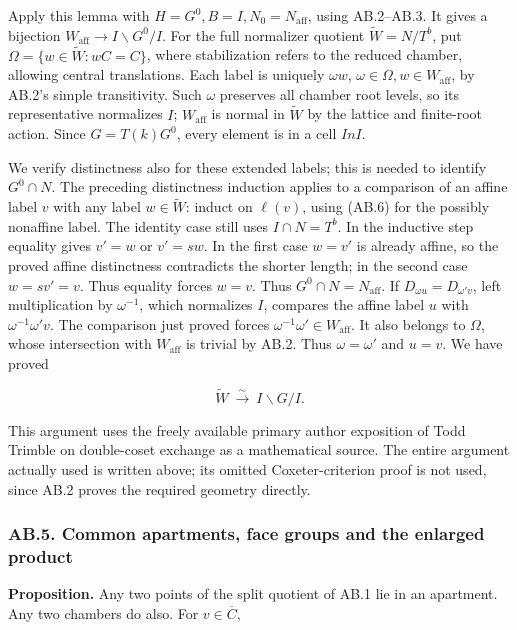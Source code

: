 \documentclass[
  11pt,
]{article}
\begin{document}
Apply this lemma with \(H=G^0,B=I,N_0=N_{\mathrm{aff}}\), using
AB.2--AB.3. It gives a bijection
\(W_{\mathrm{aff}}\to I\backslash G^0/I\). For the full normalizer
quotient \(\widetilde W=N/T^b\), put
\(\Omega=\{w\in\widetilde W:wC=C\}\), where stabilization refers to the
reduced chamber, allowing central translations. Each label is uniquely
\(\omega w\), \(\omega\in\Omega,w\in W_{\mathrm{aff}}\), by AB.2's
simple transitivity. Such \(\omega\) preserves all chamber root levels,
so its representative normalizes \(I\); \(W_{\mathrm{aff}}\) is normal
in \(\widetilde W\) by the lattice and finite-root action. Since
\(G=T(k)G^0\), every element is in a cell \(InI\).

We verify distinctness also for these extended labels; this is needed to
identify \(G^0\cap N\). The preceding distinctness induction applies to
a comparison of an affine label \(v\) with any label
\(w\in\widetilde W\): induct on \(\ell(v)\), using (AB.6) for the
possibly nonaffine label. The identity case still uses \(I\cap N=T^b\).
In the inductive step equality gives \(v'=w\) or \(v'=sw\). In the first
case \(w=v'\) is already affine, so the proved affine distinctness
contradicts the shorter length; in the second case \(w=sv'=v\). Thus
equality forces \(w=v\). Thus \(G^0\cap N=N_{\mathrm{aff}}\). If
\(D_{\omega u}=D_{\omega'v}\), left multiplication by \(\omega^{-1}\),
which normalizes \(I\), compares the affine label \(u\) with
\(\omega^{-1}\omega'v\). The comparison just proved forces
\(\omega^{-1}\omega'\in W_{\mathrm{aff}}\). It also belongs to
\(\Omega\), whose intersection with \(W_{\mathrm{aff}}\) is trivial by
AB.2. Thus \(\omega=\omega'\) and \(u=v\). We have proved

\[
 \widetilde W\ \xrightarrow{\sim}\ I\backslash G/I.
 \tag{AB.12}
\]

This argument uses the freely available primary author exposition of
Todd Trimble on double-coset exchange as a mathematical source. The
entire argument actually used is written above; its omitted
Coxeter-criterion proof is not used, since AB.2 proves the required
geometry directly.

\subsubsection{AB.5. Common apartments, face groups and the enlarged
product}\label{ab.5.-common-apartments-face-groups-and-the-enlarged-product}

\textbf{Proposition.} Any two points of the split quotient of AB.1 lie
in an apartment. Any two chambers do also. For \(v\in\overline C\),
\end{document}
